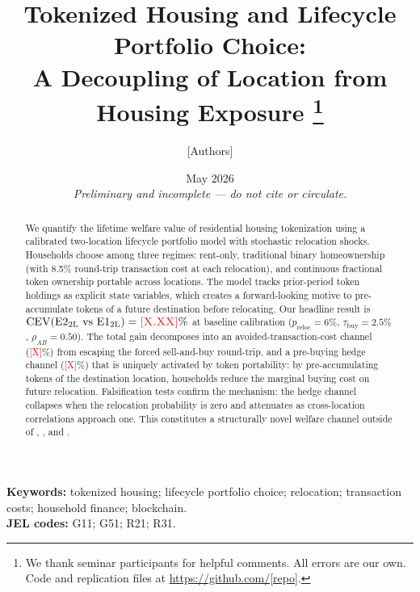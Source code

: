 \documentclass[12pt]{article}
\theoremstyle{definition}
\theoremstyle{remark}
\newcommand{\ph}[1]{\textcolor{red}{\textsc{[#1]}}}
\newcommand{\cev}{\mathrm{CEV}}
\newcommand{\taubuy}{\tau_{\mathrm{buy}}}
\newcommand{\rhoAB}{\rho_{AB}}
\newcommand{\EonesubTwoL}{\text{E1}_{\text{2L}}}
\newcommand{\EtwosubTwoL}{\text{E2}_{\text{2L}}}
\begin{document}

\title{Tokenized Housing and Lifecycle Portfolio Choice:\\
       A Decoupling of Location from Housing Exposure%
       \thanks{We thank seminar participants for helpful comments.
               All errors are our own.
               Code and replication files at \url{https://github.com/[repo]}.}}

\author{[Authors]}

\date{May 2026\\\textit{Preliminary and incomplete — do not cite or circulate.}}

\maketitle

\begin{abstract}
We quantify the lifetime welfare value of residential housing tokenization
using a calibrated two-location lifecycle portfolio model with stochastic
relocation shocks.
Households choose among three regimes: rent-only, traditional binary
homeownership (with 8.5\% round-trip transaction cost at each relocation),
and continuous fractional token ownership portable across locations.
The model tracks prior-period token holdings as explicit state variables,
which creates a forward-looking motive to pre-accumulate tokens of a future
destination before relocating.
Our headline result is $\cev(\EtwosubTwoL\ \text{vs}\ \EonesubTwoL)
= \ph{X.XX}\%$ at baseline calibration
($p_{\text{reloc}} = 6\%$, $\taubuy = 2.5\%$, $\rhoAB = 0.50$).
The total gain decomposes into an avoided-transaction-cost channel (\ph{X}\%)
from escaping the forced sell-and-buy round-trip, and a pre-buying hedge
channel (\ph{X}\%) that is uniquely activated by token portability: by
pre-accumulating tokens of the destination location, households reduce the
marginal buying cost on future relocation.
Falsification tests confirm the mechanism: the hedge channel collapses when
the relocation probability is zero and attenuates as cross-location
correlations approach one.
This constitutes a structurally novel welfare channel outside of
\citet{Liu2021}, \citet{YaoZhang2005}, and \citet{KMW2018}.
\end{abstract}

\medskip
\noindent\textbf{Keywords:} tokenized housing; lifecycle portfolio choice;
relocation; transaction costs; household finance; blockchain.\\[2pt]
\noindent\textbf{JEL codes:} G11; G51; R21; R31.
\end{document}
